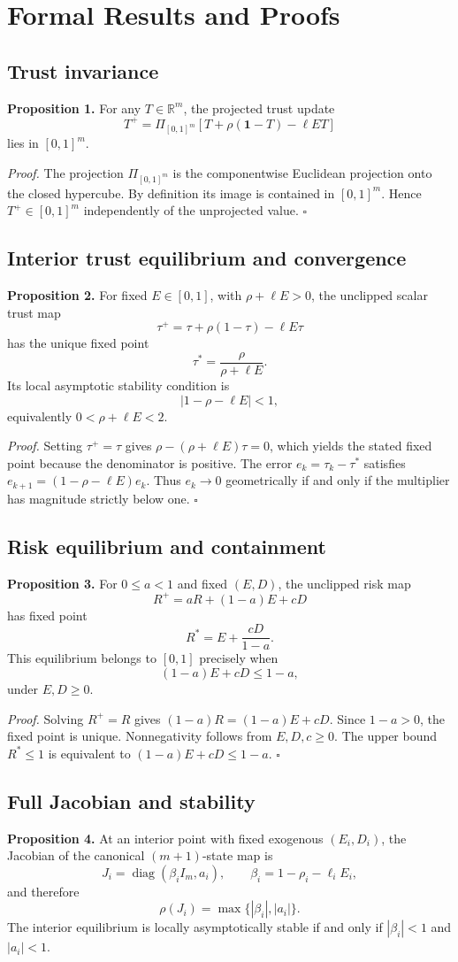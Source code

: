 \section{Formal Results and Proofs}

\subsection{Trust invariance}
\textbf{Proposition 1.} For any $T\in\mathbb{R}^m$, the projected trust update
\[
T^+=\Pi_{[0,1]^m}[T+\rho(\mathbf 1-T)-\ell ET]
\]
lies in $[0,1]^m$.

\textit{Proof.} The projection $\Pi_{[0,1]^m}$ is the componentwise Euclidean projection onto the closed hypercube. By definition its image is contained in $[0,1]^m$. Hence $T^+\in[0,1]^m$ independently of the unprojected value. \hfill$\square$

\subsection{Interior trust equilibrium and convergence}
\textbf{Proposition 2.} For fixed $E\in[0,1]$, with $\rho+\ell E>0$, the unclipped scalar trust map
\[
\tau^+=\tau+\rho(1-\tau)-\ell E\tau
\]
has the unique fixed point
\[
\tau^*=\frac{\rho}{\rho+\ell E}.
\]
Its local asymptotic stability condition is
\[
|1-\rho-\ell E|<1,
\]
equivalently $0<\rho+\ell E<2$.

\textit{Proof.} Setting $\tau^+=\tau$ gives $\rho-(\rho+\ell E)\tau=0$, which yields the stated fixed point because the denominator is positive. The error $e_k=\tau_k-\tau^*$ satisfies $e_{k+1}=(1-\rho-\ell E)e_k$. Thus $e_k\to0$ geometrically if and only if the multiplier has magnitude strictly below one. \hfill$\square$

\subsection{Risk equilibrium and containment}
\textbf{Proposition 3.} For $0\le a<1$ and fixed $(E,D)$, the unclipped risk map
\[
R^+=aR+(1-a)E+cD
\]
has fixed point
\[
R^*=E+\frac{cD}{1-a}.
\]
This equilibrium belongs to $[0,1]$ precisely when
\[
(1-a)E+cD\le1-a,
\]
under $E,D\ge0$.

\textit{Proof.} Solving $R^+=R$ gives $(1-a)R=(1-a)E+cD$. Since $1-a>0$, the fixed point is unique. Nonnegativity follows from $E,D,c\ge0$. The upper bound $R^*\le1$ is equivalent to $(1-a)E+cD\le1-a$. \hfill$\square$

\subsection{Full Jacobian and stability}
\textbf{Proposition 4.} At an interior point with fixed exogenous $(E_i,D_i)$, the Jacobian of the canonical $(m+1)$-state map is
\[
J_i=\operatorname{diag}(\beta_i I_m,a_i),\qquad
\beta_i=1-\rho_i-\ell_iE_i,
\]
and therefore
\[
\rho(J_i)=\max\{|\beta_i|,|a_i|\}.
\]
The interior equilibrium is locally asymptotically stable if and only if $|\beta_i|<1$ and $|a_i|<1$.

